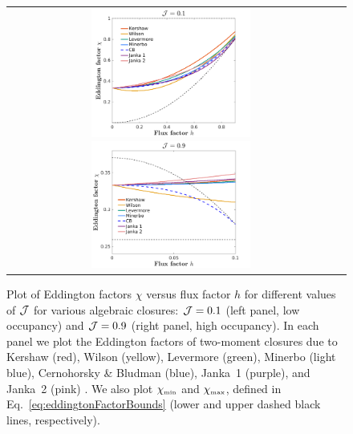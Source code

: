 \begin{figure}[h]
  \centering
  \begin{tabular}{cc}
    \includegraphics[width=0.5\textwidth]{figures/Closures0_10}
    \includegraphics[width=0.5\textwidth]{figures/Closures0_90}
  \end{tabular}
   \caption{Plot of Eddington factors $\chi$ versus flux factor $h$ for different values of $\mathcal{J}$ for various algebraic closures: $\mathcal{J}=0.1$ (left panel, low occupancy) and $\mathcal{J}=0.9$ (right panel, high occupancy).  In each panel we plot the Eddington factors of two-moment closures due to Kershaw (red), Wilson (yellow), Levermore (green), Minerbo (light blue), Cernohorsky \& Bludman (blue), Janka~1 (purple), and Janka~2 (pink) .  We also plot $\chi_{\mbox{\tiny min}}$ and $\chi_{\mbox{\tiny max}}$, defined in Eq.~\eqref{eq:eddingtonFactorBounds} (lower and upper dashed black lines, respectively).}
  \label{fig:EddingtonFactorsWithDifferentClosure}
\end{figure}

